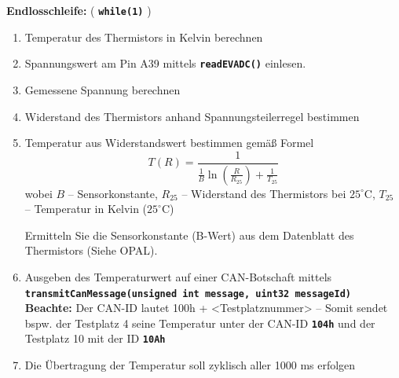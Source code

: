 \documentclass[
    fontsize=12pt,                      %
    paper=a4,                           %
    twoside=off,                       %
    DIV=15,                             %
    BCOR=12mm,                          %
    headings=normal,                    %
    headsepline=false,                   %
    footsepline=false,                  %
    headinclude=true,                   %
    footinclude=false,                  %
    toc=listof,                         %
    toc=bib,                            %
    chapterprefix=false,                %
    appendixprefix=false,               %
    numbers=noendperiod,                %
    captions=tableabove,                %
    footnotes=multiple,                 %
    bibliography=oldstyle,              %
    draft=false,                        %
]{scrreprt}
\newcommand{\Farbcode}[1]{\texttt{\textbf{\textcolor{myred}{#1}}}}
\begin{document}
\noindent
\textbf{Endlosschleife:} ( \Farbcode{while(1)} )
\begin{enumerate}
\item Temperatur des Thermistors in Kelvin berechnen
\item Spannungswert am Pin A39 mittels \Farbcode{readEVADC()} einlesen.
\item Gemessene Spannung berechnen
\item Widerstand des Thermistors anhand Spannungsteilerregel bestimmen
\item Temperatur aus Widerstandswert bestimmen gemäß Formel
\begin{equation*}
T(R)=\frac{1}{\frac{1}{B}\ln(\frac{R}{R_{25}})+\frac{1}{T_{25}}} 
\end{equation*}
wobei $B$ -- Sensorkonstante, $R_{25}$ -- Widerstand des Thermistors bei $25^\circ$C, $T_{25}$ -- Temperatur in Kelvin ($25^\circ$C)

Ermitteln Sie die Sensorkonstante (B-Wert) aus dem Datenblatt des Thermistors (Siehe OPAL).
\item Ausgeben des Temperaturwert auf einer CAN-Botschaft mittels \\ \Farbcode{transmitCanMessage(unsigned int message, uint32 messageId)}\\
\textbf{Beachte:} Der CAN-ID lautet 100h + <Testplatznummer> -- Somit sendet bspw. der Testplatz 4 seine Temperatur unter der CAN-ID \texttt{\textbf{104h}} und der Testplatz 10 mit der ID \texttt{\textbf{10Ah}}


\item Die Übertragung der Temperatur soll zyklisch aller 1000 ms erfolgen
\end{enumerate}

\end{document}
